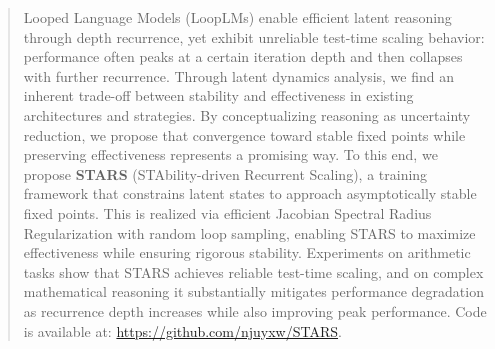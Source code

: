 \documentclass{article}
\theoremstyle{plain}
\theoremstyle{definition}
\theoremstyle{remark}
\begin{document}
\begin{abstract}
Looped Language Models (LoopLMs) enable efficient latent reasoning through depth recurrence, yet exhibit unreliable test-time scaling behavior: performance often peaks at a certain iteration depth and then collapses with further recurrence. 
Through latent dynamics analysis, we find an inherent trade-off between stability and effectiveness in existing architectures and strategies. By conceptualizing reasoning as uncertainty reduction, we propose that convergence toward stable fixed points while preserving effectiveness represents a promising way.
To this end, we propose \textbf{STARS} (STAbility-driven Recurrent Scaling), a training framework that constrains latent states to approach asymptotically stable fixed points. This is realized via efficient Jacobian Spectral Radius Regularization with random loop sampling, enabling STARS to maximize effectiveness while ensuring rigorous stability. Experiments on arithmetic tasks show that STARS achieves reliable test-time scaling, and on complex mathematical reasoning it substantially mitigates performance degradation as recurrence depth increases while also improving peak performance.
Code is available at:
\url{https://github.com/njuyxw/STARS}.

\end{abstract}









\end{document}
